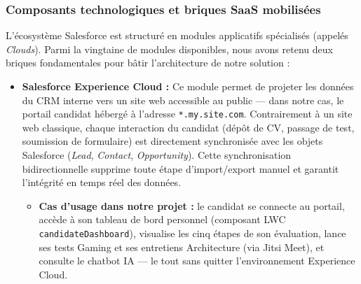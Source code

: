 \subsubsection{Composants technologiques et briques SaaS mobilisées}

L'écosystème Salesforce est structuré en modules applicatifs spécialisés (appelés \textit{Clouds}). Parmi la vingtaine de modules disponibles, nous avons retenu deux briques fondamentales pour bâtir l'architecture de notre solution :

\begin{itemize}
    \item \textbf{Salesforce Experience Cloud :} 
    Ce module permet de projeter les données du CRM interne vers un site web accessible au public --- dans notre cas, le portail candidat hébergé à l'adresse \texttt{*.my.site.com}. Contrairement à un site web classique, chaque interaction du candidat (dépôt de CV, passage de test, soumission de formulaire) est directement synchronisée avec les objets Salesforce (\textit{Lead}, \textit{Contact}, \textit{Opportunity}). Cette synchronisation bidirectionnelle supprime toute étape d'import/export manuel et garantit l'intégrité en temps réel des données.
    \begin{itemize}
        \item \textbf{Cas d'usage dans notre projet :} le candidat se connecte au portail, accède à son tableau de bord personnel (composant LWC \texttt{candidateDashboard}), visualise les cinq étapes de son évaluation, lance ses tests Gaming et ses entretiens Architecture (via Jitsi Meet), et consulte le chatbot IA --- le tout sans quitter l'environnement Experience Cloud.
    \end{itemize}


\end{itemize}
